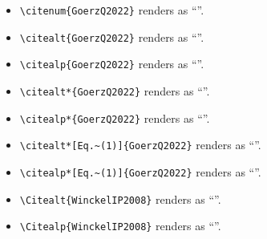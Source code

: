 \documentclass[aps,pra,onecolumn,noshowpacs,superscriptaddress,preprintnumbers,%
kamsmath,amssymb,notitlepage,letterpaper]{revtex4-2}
\begin{document}
\begin{itemize}
  \item \verb|\citenum{GoerzQ2022}| renders as ``''.
  \item \verb|\citealt{GoerzQ2022}| renders as ``\citealt{GoerzQ2022}''.
  \item \verb|\citealp{GoerzQ2022}| renders as ``\citealp{GoerzQ2022}''.
  \item \verb|\citealt*{GoerzQ2022}| renders as ``\citealt*{GoerzQ2022}''.
  \item \verb|\citealp*{GoerzQ2022}| renders as ``\citealp*{GoerzQ2022}''.
  \item \verb|\citealt*[Eq.~(1)]{GoerzQ2022}| renders as ``\citealt*[Eq.~(1)]{GoerzQ2022}''.
  \item \verb|\citealp*[Eq.~(1)]{GoerzQ2022}| renders as ``\citealp*[Eq.~(1)]{GoerzQ2022}''.
  \item \verb|\Citealt{WinckelIP2008}| renders as ``''.
  \item \verb|\Citealp{WinckelIP2008}| renders as ``''.
\end{itemize}



\end{document}
